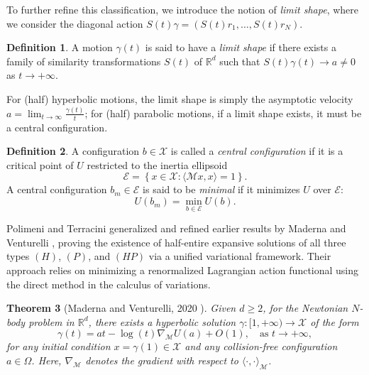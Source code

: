 \documentclass[a4paper,10pt]{amsart}
\theoremstyle{plain}
\newtheorem{thm}{Theorem}
\theoremstyle{definition}
\newtheorem{defn}[thm]{Definition}
\numberwithin{equation}{section}
\numberwithin{thm}{section}
\begin{document}
To further refine this classification, we introduce the notion of \emph{limit shape}, where we consider the diagonal action $S(t)\gamma = (S(t)r_1, \ldots, S(t)r_N)$. 

\begin{defn}
    A motion $\gamma(t)$ is said to have a \emph{limit shape} if there exists a family of similarity transformations $S(t)$ of $\mathbb{R}^d$ such that $S(t)\gamma(t) \to a \neq 0$ as $t \to +\infty$.
\end{defn}

For (half) hyperbolic motions, the limit shape is simply the asymptotic velocity $a = \lim_{t\to\infty} \frac{\gamma(t)}{t}$; for (half) parabolic motions, if a limit shape exists, it must be a central configuration.

\begin{defn}\label{def:central_configuration}
    A configuration $b \in \mathcal{X}$ is called a \emph{central configuration} if it is a critical point of $U$ restricted to the inertia ellipsoid
    \[
        \mathcal{E} = \left\{x \in \mathcal{X} : \langle \mathcal{M} x, x \rangle = 1\right\}.
    \]
    A central configuration $b_m \in \mathcal{E}$ is said to be \emph{minimal} if it minimizes $U$ over $\mathcal{E}$:
    \[
        U(b_m) = \min_{b \in \mathcal{E}} U(b).
    \]
\end{defn}

Polimeni and Terracini \cite{PolimeniTerracini} generalized and refined earlier results by Maderna and Venturelli \cite{MadernaVenturelli_GloballyMinimizingParabolic,MadernaVenturelli_HyperbolicMotions}, proving the existence of half-entire expansive solutions of all three types $(H)$, $(P)$, and $(HP)$ via a unified variational framework. Their approach relies on minimizing a renormalized Lagrangian action functional using the direct method in the calculus of variations.

\begin{thm}[Maderna and Venturelli, 2020 \cite{MadernaVenturelli_HyperbolicMotions}]\label{thm_hyperbolic}
    Given $d \geq 2$, for the Newtonian $N$-body problem in $\mathbb{R}^d$, there exists a hyperbolic solution $\gamma : [1,+\infty) \to \mathcal{X}$ of the form
    \[
        \gamma(t) = at - \log(t){\nabla_{\mathcal M}} U(a) + O(1), \quad \text{as } t \to +\infty,
    \]
    for any initial condition $x = \gamma(1) \in \mathcal{X}$ and any collision-free configuration $a \in \Omega$. {Here, $\nabla_{\mathcal M}$ denotes the gradient with respect to $\langle \cdot, \cdot \rangle_{\mathcal M}$.}
\end{thm}
\end{document}
